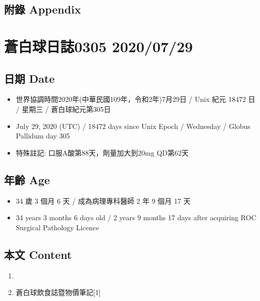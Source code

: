 \documentclass[
]{article}
\providecommand{\tightlist}{%
  \setlength{\itemsep}{0pt}\setlength{\parskip}{0pt}}
\begin{document}
\hypertarget{ux9644ux9304-appendix-27}{%
\subsection{附錄 Appendix}\label{ux9644ux9304-appendix-27}}

\hypertarget{ux84bcux767dux7403ux65e5ux8a8c0305-20200729}{%
\section{蒼白球日誌0305
2020/07/29}\label{ux84bcux767dux7403ux65e5ux8a8c0305-20200729}}

\hypertarget{ux65e5ux671f-date-28}{%
\subsection{日期 Date}\label{ux65e5ux671f-date-28}}

\begin{itemize}
\tightlist
\item
  世界協調時間2020年(中華民國109年，令和2年)7月29日 / Unix 紀元 18472 日
  / 星期三 / 蒼白球紀元第305日
\item
  July 29, 2020 (UTC) / 18472 days since Unix Epoch / Wednesday / Globus
  Pallidum day 305
\item
  特殊註記: 口服A酸第88天，劑量加大到20mg QD第62天
\end{itemize}

\hypertarget{ux5e74ux9f61-age-28}{%
\subsection{年齡 Age}\label{ux5e74ux9f61-age-28}}

\begin{itemize}
\tightlist
\item
  34 歲 3 個月 6 天 / 成為病理專科醫師 2 年 9 個月 17 天
\item
  34 years 3 months 6 days old / 2 years 9 months 17 days after
  acquiring ROC Surgical Pathology Licence
\end{itemize}

\hypertarget{ux672cux6587-content-28}{%
\subsection{本文 Content}\label{ux672cux6587-content-28}}

\begin{enumerate}
\def\labelenumi{\arabic{enumi}.}
\tightlist
\item
\item
  蒼白球飲食誌暨物價筆記{[}1{]}
\end{enumerate}
\end{document}
